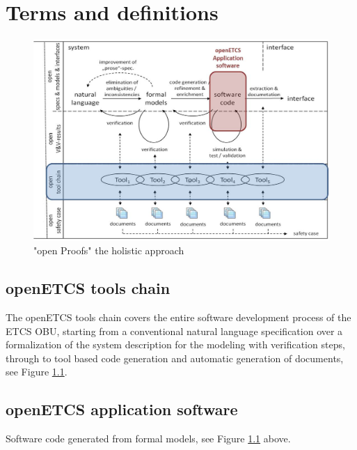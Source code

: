 \documentclass{template/openetcs_report}
\begin{document}
\mainmatter

\chapter{Terms and definitions}
\label{common-terms}

\begin{figure}[h]
  \centering
  \includegraphics[width=16cm]{openETCS1}
  \caption{"open Proofs" the holistic approach}
  \label{fig:openETCS1}
\end{figure}


\section{openETCS tools chain}
The openETCS tools chain covers the entire software development process of the ETCS OBU,
starting from a conventional natural language specification over a formalization of the system
description for the modeling with verification steps, through to tool based code generation
and automatic generation of documents, see Figure \ref{fig:openETCS1}.
\\


\section{openETCS application software}
Software code generated from formal models, see Figure \ref{fig:openETCS1} above.\\
\end{document}
